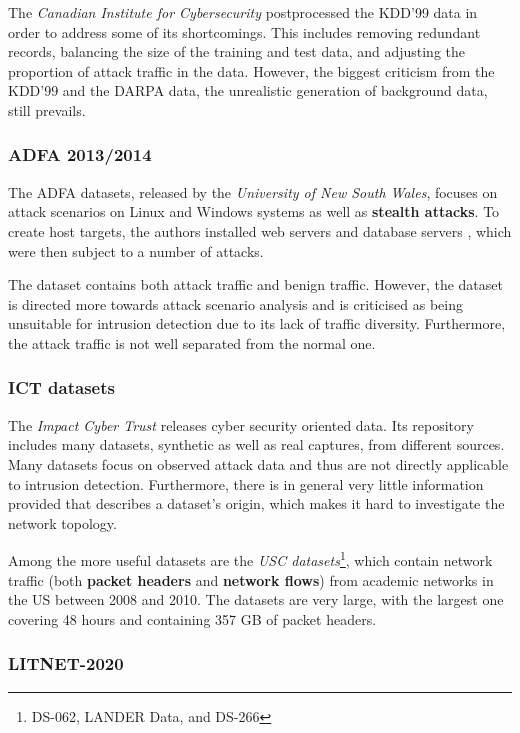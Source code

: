 The \textit{Canadian Institute for Cybersecurity} postprocessed the KDD'99 data in order to address some of its shortcomings. This includes removing redundant records, balancing the size of the training and test data, and adjusting the proportion of attack traffic in the data. However, the biggest criticism from the KDD'99 and the DARPA data, the unrealistic generation of background data, still prevails.


\subsubsection*{ADFA 2013/2014 \cite{creech2014developing,creech2013generation}}

The ADFA datasets, released by the \textit{University of New South Wales}, focuses on attack scenarios on Linux and Windows systems as well as \textbf{stealth attacks}. To create host targets, the authors  installed web servers and database servers , which were then subject to a number of attacks. 

The dataset contains both attack traffic and benign traffic. However, the dataset is directed more towards attack scenario analysis and is criticised as being unsuitable for intrusion detection due to its lack of traffic diversity. Furthermore, the attack traffic is not well separated from the normal one.

\subsubsection*{ICT datasets \cite{USC2010ICT}}

The \textit{Impact Cyber Trust} releases cyber security oriented data. Its repository includes many datasets, synthetic as well as real captures, from different sources. Many datasets focus on observed attack data and thus are not directly applicable to intrusion detection. Furthermore, there is in general very little information provided that describes a dataset's origin, which makes it hard to investigate the network topology.

Among the more useful datasets are the \textit{USC datasets}\footnote{DS-062, LANDER Data, and DS-266}, which contain network traffic (both \textbf{packet headers} and \textbf{network flows}) from academic networks in the US between 2008 and 2010. The datasets are very large, with the largest one covering 48 hours and containing 357 GB of packet headers. 

\subsubsection{LITNET-2020 \cite{damasevicius2020litnet}}

